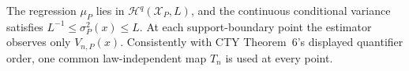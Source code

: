 The regression \(\mu_P\) lies in \(\mathcal H^q(\mathcal X_P,L)\), and the continuous conditional variance satisfies \(L^{-1}\leq\sigma_P^2(x)\leq L\).  At each support-boundary point the estimator observes only \(V_{n,P}(x)\).  Consistently with CTY Theorem~6's displayed quantifier order, one common law-independent map \(T_n\) is used at every point.
